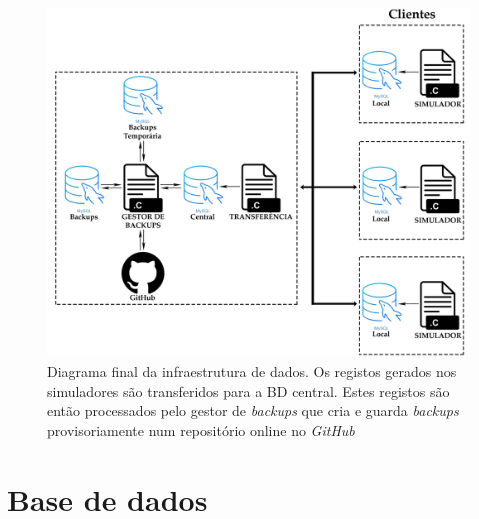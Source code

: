 \documentclass[11pt,twoside,a4paper]{report}
\begin{document}
\begin{figure}
	\begin{center}
		\includegraphics[width=1\textwidth]{Esquema_Projeto_6} %
		\caption[Diagrama final da infraestrutura]{Diagrama final da infraestrutura de dados. Os registos gerados nos simuladores são transferidos para a BD central. Estes registos são então processados pelo gestor de \textit{backups} que cria e guarda \textit{backups} provisoriamente num repositório online no \textit{GitHub}}
		\label{fig:infra3}
		\end{center}
\end{figure}

\section{Base de dados}
\end{document}
